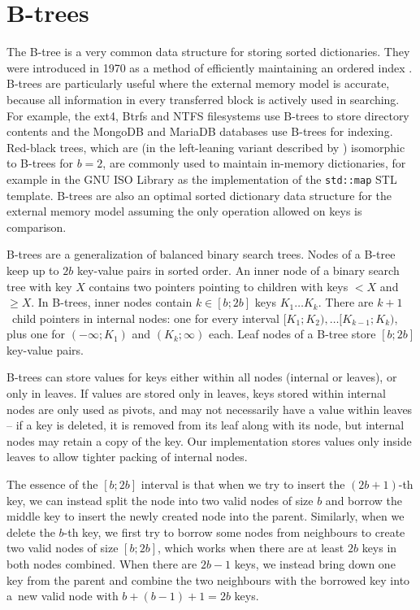 \chapter{B-trees}
\label{chapter:btree}
The B-tree is a very common data structure for storing sorted dictionaries.
They were introduced in 1970 as a method of efficiently maintaining an ordered
index \cite{btree}.
B-trees are particularly useful where the external memory model is accurate,
because all information in every transferred block is actively used
in searching. For example, the ext4, Btrfs and NTFS filesystems use B-trees
to store directory contents and the MongoDB and MariaDB databases use B-trees
for indexing.  %
Red-black trees, which are (in the left-leaning variant
described by \cite{left-leaning}) isomorphic to B-trees for $b=2$, are
commonly used to maintain in-memory dictionaries, for example in the GNU ISO
\Cpp{} Library as the implementation of the \texttt{std::map} STL template.
B-trees are also an optimal sorted dictionary data structure
for the external memory model assuming the only operation allowed on
keys is comparison.

B-trees are a generalization of balanced binary search trees.
Nodes of a B-tree keep up to $2b$ key-value pairs in sorted order.
An inner node of a binary search tree with key $X$ contains two pointers
pointing to children with keys $< X$ and $\geq X$. In B-trees,
inner nodes contain $k\in[b;2b]$ keys $K_1\ldots K_k$. There are $k+1$~child
pointers in internal nodes: one for every interval
$[K_1;K_2),\ldots [K_{k-1};K_k)$, plus one for $(-\infty;K_1)$ and
$(K_k;\infty)$ each.
Leaf nodes of a B-tree store $[b;2b]$ key-value pairs.

B-trees can store values for keys either within all nodes (internal or leaves),
or only in leaves. If values are stored only in leaves, keys stored
within internal nodes are only used as pivots, and may not necessarily
have a value within leaves -- if a key is deleted, it is removed from its leaf
along with its node, but internal nodes may retain a copy of the key.
Our implementation stores values only inside leaves to allow tighter packing
of internal nodes.

The essence of the $[b;2b]$ interval is that when we try to insert
the $(2b+1)$-th key, we can instead split the node into two valid nodes of size
$b$ and borrow the middle key to insert the newly created node into the parent.
Similarly, when we delete the $b$-th key, we first try to borrow some nodes
from neighbours to create two valid nodes of size $[b;2b]$, which works when
there are at least $2b$ keys in both nodes combined.
When there are $2b-1$ keys, we instead bring down one key from the parent
and combine the two neighbours with the borrowed key into a~new valid node with
$b+(b-1)+1=2b$ keys.

